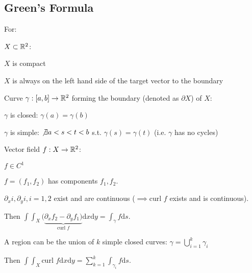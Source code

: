 \subsection{Green's Formula}
For:
\begin{compactenum}
    \item $X \subset \mathbb{R}^2$:
        \begin{compactitem}
            \item $X$ is compact
            \item $X$ is always on the left hand side of the target vector to the boundary
        \end{compactitem}
    \item Curve $\gamma: [a, b] \to \mathbb{R}^2$ forming the boundary (denoted as $\partial X$) of $X$:
        \begin{compactitem}
            \item $\gamma$ is closed: $\gamma(a) = \gamma(b)$
            \item $\gamma$ is simple: $\not\exists a < s < t < b$ s.t. $\gamma(s) = \gamma(t)$ (i.e. $\gamma$ has no cycles)
        \end{compactitem}
    \item Vector field $f: X \to \mathbb{R}^2$:
        \begin{compactitem}
            \item $f \in C^1$
            \item $f = (f_1, f_2)$ has components $f_1, f_2$.
            \item $\partial_x i, \partial_y i, i = 1, 2$ exist and are continuous ($\implies \text{curl }f$ exists and is continuous).
        \end{compactitem}
\end{compactenum}

Then $\int\int_X(\underbrace{\partial_x f_2 - \partial_y f_1)}_{\text{curl }f} \mathrm{d}x\mathrm{d}y = \int_{\gamma} f \mathrm{d}s$.

\begin{compactitem}
    \item A region can be the union of $k$ simple closed curves: $\gamma = \bigcup_{i = 1}^k \gamma_i$
        \begin{compactitem}
            \item Then $\int\int_X \text{curl }f \mathrm{d}x\mathrm{d}y = \sum_{k=1}^k \int_{\gamma_i} f \mathrm{d}s$.
        \end{compactitem}
\end{compactitem}

